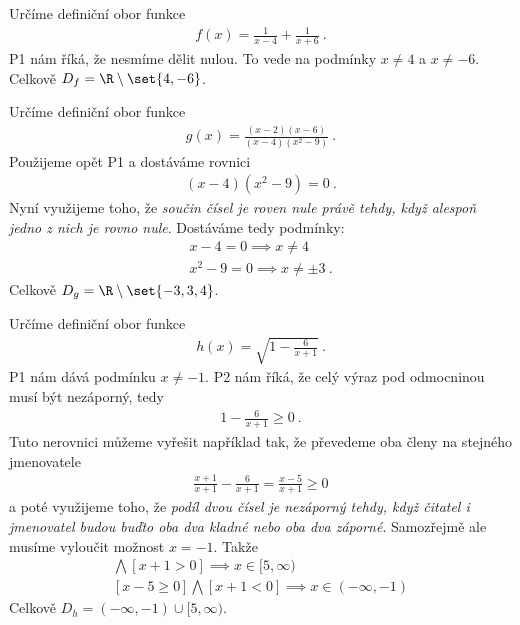 \begin{example}
    Určíme definiční obor funkce \begin{align}
        f(x) = \frac{1}{x-4} + \frac{1}{x+6} \:.
    \end{align}
    P1 nám říká, že nesmíme dělit nulou. To vede na podmínky $x \neq 4$ a $x \neq -6$. Celkově $D_f = \R \setminus \set{4,-6}$.
\end{example}

\begin{example}
    Určíme definiční obor funkce \begin{align}
        g(x) = \frac{(x-2)(x-6)}{(x-4)(x^2-9)} \:.
    \end{align}
    Použijeme opět P1 a dostáváme rovnici \begin{align}
        (x-4)(x^2-9) = 0 \:.
    \end{align}
    Nyní využijeme toho, že \textit{součin čísel je roven nule právě tehdy, když alespoň jedno z nich je rovno nule}. Dostáváme tedy podmínky:
    \begin{align}
        x - 4 = 0 \implies x \neq 4 \\
        x^2 - 9 = 0 \implies x \neq \pm 3 \:.
    \end{align}
    Celkově $D_g = \R \setminus \set{-3,3,4}$.
\end{example}

\begin{example}
    Určíme definiční obor funkce \begin{align}
        h(x) = \sqrt{1 - \frac{6}{x+1}} \:.
    \end{align}
    P1 nám dává podmínku $x \neq -1$. P2 nám říká, že celý výraz pod odmocninou musí být nezáporný, tedy \begin{align}
        1 - \frac{6}{x+1} \geq 0 \:.
    \end{align}
    Tuto nerovnici můžeme vyřešit například tak, že převedeme oba členy na stejného jmenovatele
    \begin{align}
        \frac{x+1}{x+1} - \frac{6}{x+1} = \frac{x-5}{x+1} \geq 0
    \end{align}
    a poté využijeme toho, že \textit{podíl dvou čísel je nezáporný tehdy, když čitatel i jmenovatel budou buďto oba dva kladné nebo oba dva záporné}. Samozřejmě ale musíme vyloučit možnost $x=-1$. Takže \begin{align}
        [x-5 \leq 0] \bigwedge [x+1 > 0] \implies x \in [5,\infty) \\
        [x-5 \geq 0] \bigwedge [x+1 < 0] \implies x \in (-\infty,-1) 
    \end{align}
    Celkově $D_h = (-\infty, -1) \cup [5,\infty)$.
\end{example}

